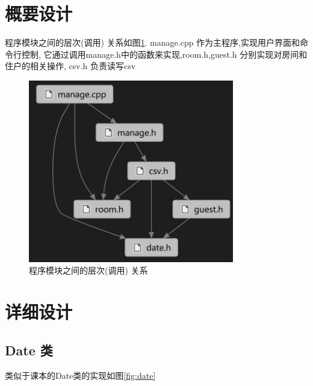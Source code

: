 \documentclass[UTF8]{ctexart}
\begin{document}
\section{概要设计}
  程序模块之间的层次(调用) 关系如图\ref{fig:h}.
  manage.cpp 作为主程序,实现用户界面和命令行控制, 它通过调用manage.h中的函数来实现,room.h,guest.h 分别实现对房间和住户的相关操作, csv.h 负责读写csv
  \begin{figure}[H]
    \centering
    \includegraphics[width=0.8\textwidth]{h}
    \caption{程序模块之间的层次(调用) 关系}
    \label{fig:h}
  \end{figure}
\section{详细设计}

  \subsection{Date 类}

    类似于课本\cite{textbook}的Date类的实现如图\ref{fig:date}
\end{document}
